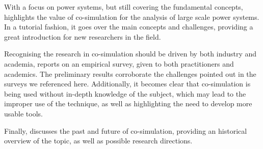 With a focus on power systems, but still covering the fundamental concepts, \cite{Palensky2017} highlights the value of co-simulation for the analysis of large scale power systems. 
In a tutorial fashion, it goes over the main concepts and challenges, providing a great introduction for new researchers in the field.

Recognising the research in co-simulation should be driven by both industry and academia, \cite{Schweiger2018a} reports on an empirical survey, given to both practitioners and academics.
The preliminary results  corroborate the challenges pointed out in the surveys we referenced here.
Additionally, it becomes clear that co-simulation is being used without in-depth knowledge of the subject, which may lead to the improper use of the technique, as well as highlighting the need to develop more usable tools.

Finally, \cite{Gomes2018b} discusses the past and future of co-simulation, providing an historical overview of the topic, as well as possible research directions.

